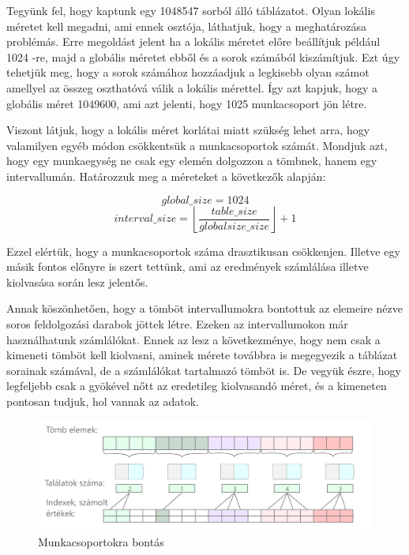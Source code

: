 Tegyünk fel, hogy kaptunk egy 1048547 sorból álló táblázatot.
Olyan lokális méretet kell megadni, ami ennek osztója, láthatjuk, hogy a meghatározása problémás.
Erre megoldást jelent ha a lokális méretet előre beállítjuk például 1024 -re, majd a globális méretet ebből és a sorok számából kiszámítjuk.
Ezt úgy tehetjük meg, hogy a sorok számához hozzáadjuk a legkisebb olyan számot amellyel az összeg oszthatóvá válik a lokális mérettel.
Így azt kapjuk, hogy a globális méret 1049600, ami azt jelenti, hogy 1025 munkacsoport jön létre. 

Viszont látjuk, hogy a lokális méret korlátai miatt szükség lehet arra, hogy valamilyen egyéb módon csökkentsük a munkacsoportok számát.
Mondjuk azt, hogy egy munkaegység ne csak egy elemén dolgozzon a tömbnek, hanem egy intervallumán.
Határozzuk meg a méreteket a következők alapján:

$$ global\_size = 1024 $$
$$interval\_size =  \left\lfloor \frac{table\_size }{globalsize\_size} \right\rfloor  +1  $$

Ezzel elértük, hogy a munkacsoportok száma drasztikusan csökkenjen. Illetve egy másik fontos előnyre is szert tettünk, ami az eredmények számlálása illetve kiolvasása során lesz jelentős.


Annak köszönhetően, hogy a tömböt intervallumokra bontottuk az elemeire nézve soros feldolgozási darabok jöttek létre. Ezeken az intervallumokon már 
használhatunk számlálókat. Ennek az lesz a következménye, hogy nem csak a kimeneti tömböt kell kiolvasni, aminek mérete továbbra is megegyezik a táblázat sorainak számával, de a számlálókat tartalmazó tömböt is.
De vegyük észre, hogy legfeljebb csak a gyökével nőtt az eredetileg kiolvasandó méret, és a kimeneten pontosan tudjuk, hol vannak az adatok.

\begin{figure}[h!]
\centering
\includegraphics[width=\textwidth]{images/itemgroup.png}
\caption{Munkacsoportokra bontás}
\label{fig:opencl}
\end{figure}

